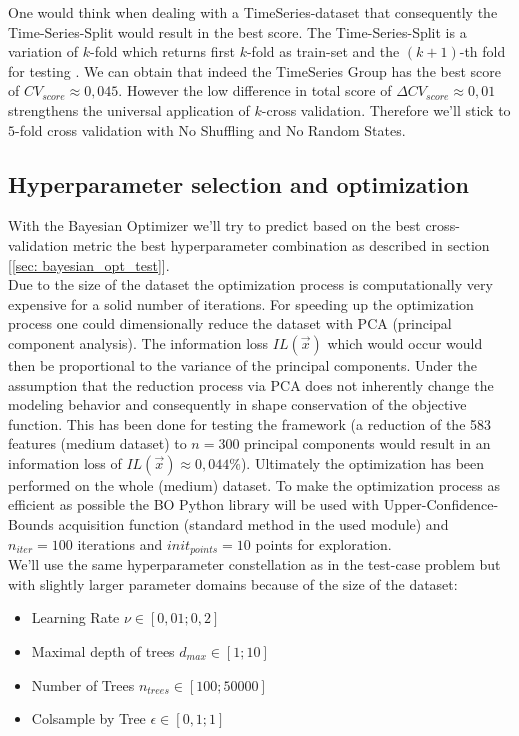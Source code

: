 \documentclass[12pt, a4paper]{article}
\begin{document}
One would think when dealing with a TimeSeries-dataset that consequently the Time-Series-Split would result in the best score. The Time-Series-Split is a variation of $k$-fold which returns first $k$-fold as train-set and the $(k + 1)$-th fold for testing \cite{Scikit2023}. We can obtain that indeed the TimeSeries Group has the best score of $CV_{score} \approx 0{,}045$. However the low difference in total score of $\Delta CV_{score} \approx 0{,}01$ strengthens the universal application of $k$-cross validation. Therefore we'll stick to $5$-fold cross validation with No Shuffling and No Random States.
\subsection{Hyperparameter selection and optimization}
\label{sec: bayesian_opt_numerai}
With the Bayesian Optimizer we'll try to predict based on the best cross-validation metric the best hyperparameter combination as described in section [\ref{sec: bayesian_opt_test}]. \\
Due to the size of the dataset the optimization process is computationally very expensive for a solid number of iterations.
For speeding up the optimization process one could dimensionally reduce the dataset with PCA (principal component analysis). The information loss $IL(\vec{x})$ which would occur would then be proportional to the variance of the principal components.
Under the assumption that the reduction process via PCA does not inherently change the modeling behavior and consequently in shape conservation of the objective function. This has been done for testing the framework (a reduction of the 583 features (medium dataset) to $n = 300$ principal components would result in an information loss of $IL(\vec{x}) \approx 0{,}044 \%$). Ultimately the optimization has been performed on the whole (medium) dataset.
To make the optimization process as efficient as possible the BO Python library \cite{Nogueira2014} will be used with Upper-Confidence-Bounds acquisition function (standard method in the used module) and $n_{iter} = 100$ iterations and $init_{points} = 10$ points for exploration. \\
\newpage
We'll use the same hyperparameter constellation as in the test-case problem but with slightly larger parameter domains because of the size of the dataset:
\begin{itemize}
    \item Learning Rate $\nu \in  [0{,}01 ; 0{,}2]$
    \item Maximal depth of trees $d_{max} \in [1; 10]$
    \item Number of Trees $n_{trees} \in [100; 50000]$
    \item Colsample by Tree $\epsilon \in [0{,}1; 1]$
\end{itemize}
\end{document}
